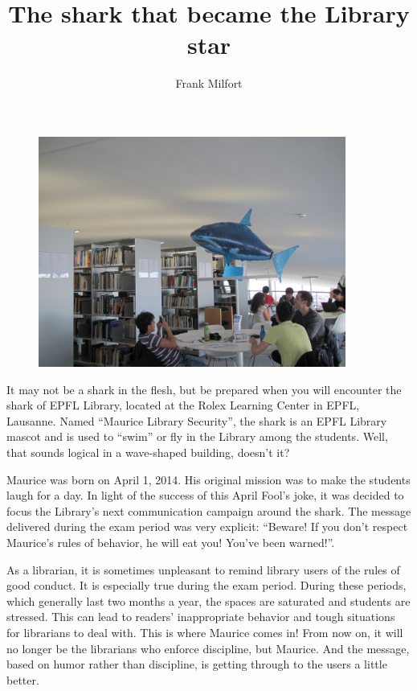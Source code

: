 \documentclass[a4paper,
fontsize=11pt,
oneside,
numbers=noperiodatend,
parskip=half-,
bibliography=totoc,
final
]{scrartcl}
\title{\LARGE{The shark that became the Library star}}%
\author{Frank Milfort} %
\date{}
\begin{document}
\maketitle
\thispagestyle{fancyplain} 


\begin{figure}[h!]
\centering
\includegraphics[width=0.9\textwidth]{img/image1.jpg}
\end{figure}

It may not be a shark in the flesh, but be prepared when you will
encounter the shark of EPFL Library, located at the Rolex Learning
Center in EPFL, Lausanne. Named \enquote{Maurice Library Security}, the
shark is an EPFL Library mascot and is used to \enquote{swim} or fly in
the Library among the students. Well, that sounds logical in a
wave-shaped building, doesn't it?

Maurice was born on April 1, 2014. His original mission was to make the
students laugh for a day. In light of the success of this April Fool's
joke, it was decided to focus the Library's next communication campaign
around the shark. The message delivered during the exam period was very
explicit: \enquote{Beware! If you don't respect Maurice's rules of
behavior, he will eat you! You've been warned!}.

As a librarian, it is sometimes unpleasant to remind library users of
the rules of good conduct. It is especially true during the exam period.
During these periods, which generally last two months a year, the spaces
are saturated and students are stressed. This can lead to readers'
inappropriate behavior and tough situations for librarians to deal with.
This is where Maurice comes in! From now on, it will no longer be the
librarians who enforce discipline, but Maurice. And the message, based
on humor rather than discipline, is getting through to the users a
little better.
\end{document}
